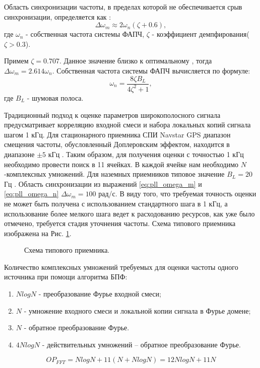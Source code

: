 Область синхронизации частоты, в пределах которой не обеспечивается срыв синхронизации, определяется как \cite{spilker-book}:
\begin{equation}
	\label{eq:pll_omega_m}
	\Delta \omega_m \approx 2 \omega_n (\zeta+0.6),
\end{equation}
где ${\omega_n}$ - собственная частота системы ФАПЧ, ${\zeta}$ - коэффициент демпфирования(${\zeta > 0.3}$).

Примем ${\zeta = 0.707}$. Данное значение   близко к оптимальному \cite{tsui, spilker-book}, тогда ${\Delta \omega_m = 2.614 \omega_n}$.
Собственная частота системы ФАПЧ вычисляется по формуле:
\begin{equation}
	\label{eq:pll_omega_n}
	\omega_n = \frac{8 \zeta B_L}{4 \zeta^2 + 1},
\end{equation}
где ${B_L}$ - шумовая полоса.

Традиционный подход к оценке параметров широкополосного сигнала предусматривает корреляцию входной смеси и набора локальных копий сигнала шагом 1 кГц.
Для стационарного приемника СПИ Navstar GPS диапазон смещения частоты, обусловленный Доплеровским эффектом, находится в диапазоне ${\pm 5}$ кГц \cite{tsui, shahtarin_sync}.
Таким образом, для получения оценки с точностью 1 кГц необходимо провести поиск в 11 ячейках. В каждой ячейке нам необходимо ${N}$-комплексных умножений.
Для наземных приемников типовое значение ${B_L=20}$ Гц \cite{tsui}. Область синхронизации из выражений \ref{eq:pll_omega_m} и \ref{eq:pll_omega_n}
${\Delta \omega_m = 100}$ рад/с. В виду того, что требуемая точность оценки не может быть получена с использованием стандартного шага в 1 кГц,
а использование более мелкого шага ведет к расходованию ресурсов, как уже было отмечено, требуется стадия уточнения частоты.
Схема типового приемника изображена на Рис. \ref{pic:corr_scheme}.
\begin{figure}[h]
	\center{}
	\caption{Схема типового приемника.}
	\label{pic:corr_scheme}
\end{figure}

Количество комплексных умножений требуемых для оценки частоты одного источника при помощи алгоритма БПФ:
\begin{enumerate}
\item ${NlogN}$ - преобразование Фурье входной смеси;
\item ${N}$ - умножение входного смеси и локальной копии сигнала в Фурье домене;
\item ${N}$ - обратное преобразование Фурье.
\item ${4NlogN}$ - действительных умножений – обратное преобразование Фурье. 
\end{enumerate}
\begin{equation}
	\label{eq:op_fft}
	OP_{FFT} = NlogN + 11(N + NlogN) = 12NlogN + 11N
\end{equation}

